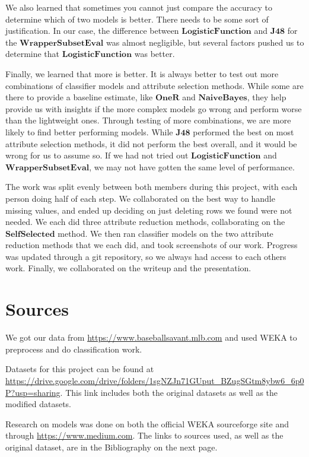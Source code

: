 \documentclass[12pt]{article}
\begin{document}
We also learned that sometimes you cannot just compare the accuracy to determine which of two models is better. There needs to be some sort of justification. In our case, the difference between $\textbf{LogisticFunction}$ and $\textbf{J48}$ for the $\textbf{WrapperSubsetEval}$ was almost negligible, but several factors pushed us to determine that $\textbf{LogisticFunction}$ was better. 

Finally, we learned that more is better. It is always better to test out more combinations of classifier models and attribute selection methods. While some are there to provide a baseline estimate, like $\textbf{OneR}$ and $\textbf{NaiveBayes}$, they help provide us with insights if the more complex models go wrong and perform worse than the lightweight ones. Through testing of more combinations, we are more likely to find better performing models. While $\textbf{J48}$ performed the best on most attribute selection methods, it did not perform the best overall, and it would be wrong for us to assume so. If we had not tried out $\textbf{LogisticFunction}$ and $\textbf{WrapperSubsetEval}$, we may not have gotten the same level of performance. 

The work was split evenly between both members during this project, with each person doing half of each step. We collaborated on the best way to handle missing values, and ended up deciding on just deleting rows we found were not needed. We each did three attribute reduction methods, collaborating on the $\textbf{SelfSelected}$ method. We then ran classifier models on the two attribute reduction methods that we each did, and took screenshots of our work. Progress was updated through a git repository, so we always had access to each other\textquotesingle s work. Finally, we collaborated on the writeup and the presentation. 

\section{Sources}
We got our data from \url{https://www.baseballsavant.mlb.com} and used WEKA to preprocess and do classification work. 

Datasets for this project can be found at \url{https://drive.google.com/drive/folders/1sgNZJn71GUput_BZugSGtm8ybw6_6p0P?usp=sharing}. This link includes both the original datasets as well as the modified datasets. 

Research on models was done on both the official WEKA sourceforge site and through \url{https://www.medium.com}. The links to sources used, as well as the original dataset, are in the Bibliography on the next page. 
\end{document}
